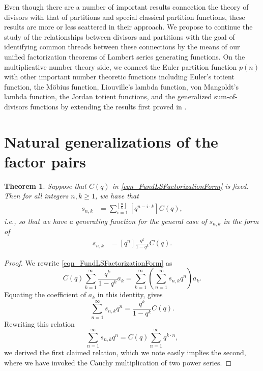 \documentclass[10pt,reqno]{amsart}
\numberwithin{figure}{section}
\numberwithin{table}{section}
\theoremstyle{plain}
\newtheorem{theorem}{Theorem}
\numberwithin{theorem}{section}
\theoremstyle{remark}
\begin{document}
Even though there are a number of important results connection the theory of divisors with 
that of partitions and special classical partition functions, these results are more or less 
scattered in their approach. We propose to continue the study of the relationships between 
divisors and partitions with the goal of identifying common threads between these connections 
by the means of our unified factorization theorems of Lambert series generating functions. 
On the multiplicative number theory side, we connect the Euler partition function $p(n)$ 
with other important number theoretic functions including Euler's totient function, 
the M\"obius function, Liouville's lambda function, von Mangoldt's lambda function, the 
Jordan totient functions, and the generalized sum-of-divisors functions by extending the 
results first proved in \cite{MERCA-SCHMIDT1,MERCA-LSFACTTHM,SCHMIDT-LSFACTTHM}. 

\section{Natural generalizations of the factor pairs} 
\label{Section_NaturalGensOfFactorPairs} 

\begin{theorem}
	\label{theorem_1}
	Suppose that $C(q)$ in \eqref{eqn_FundLSFactorizationForm} is fixed. 
	Then for all integers $n, k \geq 1$, 
	we have that 
	\begin{align*} 
	\tag{i}
	s_{n,k} 
	
	     & = 
	     \sum_{i=1}^{\left\lfloor \frac{n}{k} \right\rfloor} [q^{n-i\cdot k}]C(q), 
	\end{align*} 
	i.e., so that we have a generating function for the general case of $s_{n,k}$ in the form of 
	\begin{align*} 
	\tag{ii}
	s_{n,k} & = [q^n] \frac{q^k}{1-q^k} C(q). 
	\end{align*} 
\end{theorem}

\begin{proof}
We rewrite \eqref{eqn_FundLSFactorizationForm} as
$$C(q) \sum_{k=1}^{\infty} \frac{q^k}{1-q^k} a_k = \sum_{k=1}^{\infty} \left( \sum_{n=1}^{\infty} s_{n,k} q^n\right) a_k.$$
Equating the coefficient of $a_k$ in this identity, gives
$$ \sum_{n=1}^{\infty} s_{n,k} q^n = \frac{q^k}{1-q^k} C(q).$$
Rewriting this relation
$$\sum_{n=1}^{\infty} s_{n,k} q^n = C(q) \sum_{n=1}^{\infty} q^{k\cdot n},$$ 
we derived the first claimed relation, which we note easily implies the second,  
where we have invoked the Cauchy multiplication of two power series.	
\end{proof}
\end{document}
